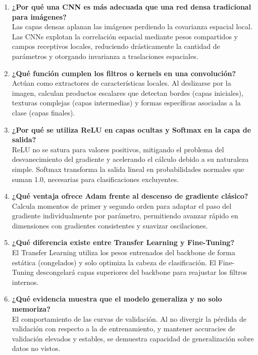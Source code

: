 \documentclass[conference,onecolumn]{IEEEtran}
\begin{document}
\begin{enumerate}
    \item \textbf{¿Por qué una CNN es más adecuada que una red densa tradicional para imágenes?}\\
    Las capas densas aplanan las imágenes perdiendo la covarianza espacial local. Las CNNs explotan la correlación espacial mediante pesos compartidos y campos receptivos locales, reduciendo drásticamente la cantidad de parámetros y otorgando invarianza a traslaciones espaciales.
    
    \item \textbf{¿Qué función cumplen los filtros o kernels en una convolución?}\\
    Actúan como extractores de características locales. Al deslizarse por la imagen, calculan productos escalares que detectan bordes (capas iniciales), texturas complejas (capas intermedias) y formas específicas asociadas a la clase (capas finales).
    
    \item \textbf{¿Por qué se utiliza ReLU en capas ocultas y Softmax en la capa de salida?}\\
    ReLU no se satura para valores positivos, mitigando el problema del desvanecimiento del gradiente y acelerando el cálculo debido a su naturaleza simple. Softmax transforma la salida lineal en probabilidades normales que suman 1.0, necesarias para clasificaciones excluyentes.
    
    \item \textbf{¿Qué ventaja ofrece Adam frente al descenso de gradiente clásico?}\\
    Calcula momentos de primer y segundo orden para adaptar el paso del gradiente individualmente por parámetro, permitiendo avanzar rápido en dimensiones con gradientes consistentes y suavizar oscilaciones.
    
    \item \textbf{¿Qué diferencia existe entre Transfer Learning y Fine-Tuning?}\\
    El Transfer Learning utiliza los pesos entrenados del backbone de forma estática (congelados) y solo optimiza la cabeza de clasificación. El Fine-Tuning descongelará capas superiores del backbone para reajustar los filtros internos.
    
    \item \textbf{¿Qué evidencia muestra que el modelo generaliza y no solo memoriza?}\\
    El comportamiento de las curvas de validación. Al no divergir la pérdida de validación con respecto a la de entrenamiento, y mantener accuracies de validación elevados y estables, se demuestra capacidad de generalización sobre datos no vistos.
    

\end{enumerate}
\end{document}
